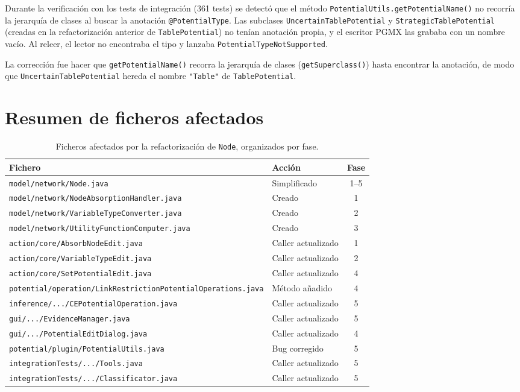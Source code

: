 \documentclass[11pt,a4paper]{article}
\newcommand{\code}[1]{\texttt{#1}}
\begin{document}
Durante la verificaci\'on con los tests de integraci\'on (361 tests) se
detect\'o que el m\'etodo \code{PotentialUtils.getPotentialName()} no
recorr\'ia la jerarqu\'ia de clases al buscar la anotaci\'on
\code{@PotentialType}.  Las subclases \code{UncertainTablePotential} y
\code{StrategicTablePotential} (creadas en la refactorizaci\'on anterior
de \code{TablePotential}) no ten\'ian anotaci\'on propia, y el escritor
PGMX las grababa con un nombre vac\'io.  Al releer, el lector no
encontraba el tipo y lanzaba \code{PotentialTypeNotSupported}.

La correcci\'on fue hacer que \code{getPotentialName()} recorra la
jerarqu\'ia de clases (\code{getSuperclass()}) hasta encontrar la
anotaci\'on, de modo que \code{UncertainTablePotential} hereda el
nombre \code{"Table"} de \code{TablePotential}.

\section{Resumen de ficheros afectados}

\begin{table}[H]
\centering
\small
\begin{tabular}{llc}
\toprule
\textbf{Fichero} & \textbf{Acci\'on} & \textbf{Fase} \\
\midrule
\code{model/network/Node.java} & Simplificado & 1--5 \\
\code{model/network/NodeAbsorptionHandler.java} & Creado & 1 \\
\code{model/network/VariableTypeConverter.java} & Creado & 2 \\
\code{model/network/UtilityFunctionComputer.java} & Creado & 3 \\
\midrule
\code{action/core/AbsorbNodeEdit.java} & Caller actualizado & 1 \\
\code{action/core/VariableTypeEdit.java} & Caller actualizado & 2 \\
\code{action/core/SetPotentialEdit.java} & Caller actualizado & 4 \\
\code{potential/operation/LinkRestrictionPotentialOperations.java}
  & M\'etodo a\~nadido & 4 \\
\midrule
\code{inference/.../CEPotentialOperation.java} & Caller actualizado & 5 \\
\code{gui/.../EvidenceManager.java} & Caller actualizado & 5 \\
\code{gui/.../PotentialEditDialog.java} & Caller actualizado & 4 \\
\midrule
\code{potential/plugin/PotentialUtils.java} & Bug corregido & 5 \\
\code{integrationTests/.../Tools.java} & Caller actualizado & 5 \\
\code{integrationTests/.../Classificator.java} & Caller actualizado & 5 \\
\bottomrule
\end{tabular}
\caption{Ficheros afectados por la refactorizaci\'on de \code{Node},
         organizados por fase.}
\label{tab:ficheros}
\end{table}
\end{document}
